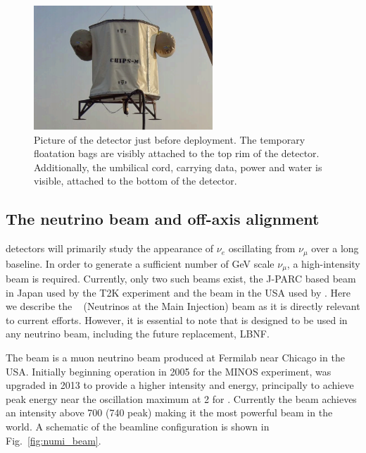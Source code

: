 \begin{figure} %
    \includegraphics[width=0.6\textwidth]{diagrams/4-chips/chips_m.png}
    \caption[Picture of the \chipsm detector.]
    {Picture of the \chipsm detector just before deployment. The temporary floatation bags are
        visibly attached to the top rim of the detector. Additionally, the umbilical cord,
        carrying data, power and water is visible, attached to the bottom of the detector.}
    \label{fig:chips_m}
\end{figure}

\subsection{The neutrino beam and off-axis alignment} %
\label{sec:chips_concept_beam} %

\chips detectors will primarily study the appearance of $\nu_{e}$ oscillating from $\nu_{\mu}$
over a long baseline. In order to generate a sufficient number of GeV scale $\nu_{\mu}$, a
high-intensity beam is required. Currently, only two such beams exist, the J-PARC based beam in
Japan used by the T2K experiment and the \numi beam in the USA used by \nova. Here we describe the
\numi~\cite{adamson2016} (Neutrinos at the Main Injection) beam as it is directly relevant to
current \chips efforts. However, it is essential to note that \chips is designed to be used in any
neutrino beam, including the future \numi replacement, LBNF.

The \numi beam is a muon neutrino beam produced at Fermilab near Chicago in the USA. Initially
beginning operation in 2005 for the MINOS experiment, \numi was upgraded in 2013 to provide a
higher intensity and energy, principally to achieve peak energy near the oscillation maximum at
\unit{2}{\GeV} for \nova. Currently the \numi beam achieves an intensity above
\unit{700}{} (\unit{740}{} peak) making it the most powerful beam in the
world. A schematic of the \numi beamline configuration is shown in Fig.~\ref{fig:numi_beam}.

